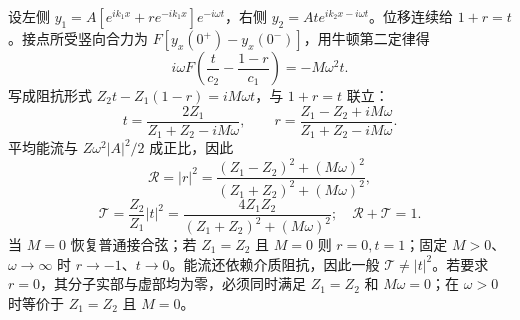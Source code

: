 设左侧 \(y_1=A[e^{ik_1x}+r e^{-ik_1x}]e^{-i\omega t}\)，右侧 \(y_2=At e^{ik_2x-i\omega t}\)。位移连续给 \(1+r=t\)。接点所受竖向合力为 \(F[y_x(0^+)-y_x(0^-)]\)，用牛顿第二定律得
\[i\omega F\left(\frac{t}{c_2}-\frac{1-r}{c_1}\right)=-M\omega^2t.\]
写成阻抗形式 \(Z_2t-Z_1(1-r)=iM\omega t\)，与 \(1+r=t\) 联立：
\[t=\frac{2Z_1}{Z_1+Z_2-iM\omega},\qquad r=\frac{Z_1-Z_2+iM\omega}{Z_1+Z_2-iM\omega}.\]
平均能流与 \(Z\omega^2|A|^2/2\) 成正比，因此
\[\mathcal R=|r|^2=\frac{(Z_1-Z_2)^2+(M\omega)^2}{(Z_1+Z_2)^2+(M\omega)^2},\]
\[\mathcal T=\frac{Z_2}{Z_1}|t|^2=\frac{4Z_1Z_2}{(Z_1+Z_2)^2+(M\omega)^2};\quad \mathcal R+\mathcal T=1.\]
当 \(M=0\) 恢复普通接合弦；若 \(Z_1=Z_2\) 且 \(M=0\) 则 \(r=0,t=1\)；固定 \(M>0\)、\(\omega\to\infty\) 时 \(r\to-1\)、\(t\to0\)。能流还依赖介质阻抗，因此一般 \(\mathcal T\ne|t|^2\)。若要求 \(r=0\)，其分子实部与虚部均为零，必须同时满足 \(Z_1=Z_2\) 和 \(M\omega=0\)；在 \(\omega>0\) 时等价于 \(Z_1=Z_2\) 且 \(M=0\)。
